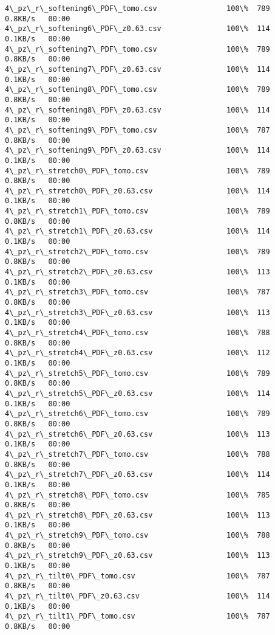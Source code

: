 \documentclass[11pt]{article}
\begin{document}
\begin{Verbatim}[commandchars=\\\{\}]
4\_pz\_r\_softening6\_PDF\_tomo.csv                100\%  789     0.8KB/s   00:00    
4\_pz\_r\_softening6\_PDF\_z0.63.csv               100\%  114     0.1KB/s   00:00    
4\_pz\_r\_softening7\_PDF\_tomo.csv                100\%  789     0.8KB/s   00:00    
4\_pz\_r\_softening7\_PDF\_z0.63.csv               100\%  114     0.1KB/s   00:00    
4\_pz\_r\_softening8\_PDF\_tomo.csv                100\%  789     0.8KB/s   00:00    
4\_pz\_r\_softening8\_PDF\_z0.63.csv               100\%  114     0.1KB/s   00:00    
4\_pz\_r\_softening9\_PDF\_tomo.csv                100\%  787     0.8KB/s   00:00    
4\_pz\_r\_softening9\_PDF\_z0.63.csv               100\%  114     0.1KB/s   00:00    
4\_pz\_r\_stretch0\_PDF\_tomo.csv                  100\%  789     0.8KB/s   00:00    
4\_pz\_r\_stretch0\_PDF\_z0.63.csv                 100\%  114     0.1KB/s   00:00    
4\_pz\_r\_stretch1\_PDF\_tomo.csv                  100\%  789     0.8KB/s   00:00    
4\_pz\_r\_stretch1\_PDF\_z0.63.csv                 100\%  114     0.1KB/s   00:00    
4\_pz\_r\_stretch2\_PDF\_tomo.csv                  100\%  789     0.8KB/s   00:00    
4\_pz\_r\_stretch2\_PDF\_z0.63.csv                 100\%  113     0.1KB/s   00:00    
4\_pz\_r\_stretch3\_PDF\_tomo.csv                  100\%  787     0.8KB/s   00:00    
4\_pz\_r\_stretch3\_PDF\_z0.63.csv                 100\%  113     0.1KB/s   00:00    
4\_pz\_r\_stretch4\_PDF\_tomo.csv                  100\%  788     0.8KB/s   00:00    
4\_pz\_r\_stretch4\_PDF\_z0.63.csv                 100\%  112     0.1KB/s   00:00    
4\_pz\_r\_stretch5\_PDF\_tomo.csv                  100\%  789     0.8KB/s   00:00    
4\_pz\_r\_stretch5\_PDF\_z0.63.csv                 100\%  114     0.1KB/s   00:00    
4\_pz\_r\_stretch6\_PDF\_tomo.csv                  100\%  789     0.8KB/s   00:00    
4\_pz\_r\_stretch6\_PDF\_z0.63.csv                 100\%  113     0.1KB/s   00:00    
4\_pz\_r\_stretch7\_PDF\_tomo.csv                  100\%  788     0.8KB/s   00:00    
4\_pz\_r\_stretch7\_PDF\_z0.63.csv                 100\%  114     0.1KB/s   00:00    
4\_pz\_r\_stretch8\_PDF\_tomo.csv                  100\%  785     0.8KB/s   00:00    
4\_pz\_r\_stretch8\_PDF\_z0.63.csv                 100\%  113     0.1KB/s   00:00    
4\_pz\_r\_stretch9\_PDF\_tomo.csv                  100\%  788     0.8KB/s   00:00    
4\_pz\_r\_stretch9\_PDF\_z0.63.csv                 100\%  113     0.1KB/s   00:00    
4\_pz\_r\_tilt0\_PDF\_tomo.csv                     100\%  787     0.8KB/s   00:00    
4\_pz\_r\_tilt0\_PDF\_z0.63.csv                    100\%  114     0.1KB/s   00:00    
4\_pz\_r\_tilt1\_PDF\_tomo.csv                     100\%  787     0.8KB/s   00:00    

\end{Verbatim}
\end{document}
